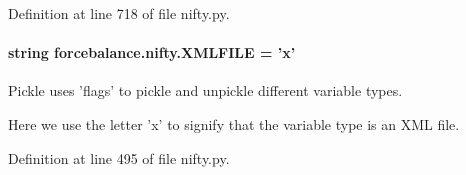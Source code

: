 Definition at line 718 of file nifty.\-py.

\hypertarget{namespaceforcebalance_1_1nifty_a338d5080f95188c37271c306f64093d8}{
\paragraph[{X\-M\-L\-F\-I\-L\-E}]{\setlength{\rightskip}{0pt plus 5cm}string forcebalance.\-nifty.\-X\-M\-L\-F\-I\-L\-E = 'x'}}\label{namespaceforcebalance_1_1nifty_a338d5080f95188c37271c306f64093d8}


Pickle uses 'flags' to pickle and unpickle different variable types. 

Here we use the letter 'x' to signify that the variable type is an X\-M\-L file. 

Definition at line 495 of file nifty.\-py.

